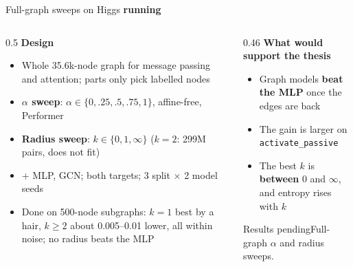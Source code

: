 \documentclass[aspectratio=169,10pt]{beamer}
\newcommand{\snote}[1]{{\scriptsize\textcolor{ink!70}{#1}}}
\newcommand{\srun}{\textcolor{warm}{\textbf{running}}}
\newcommand{\pending}[1]{\begin{alertblock}{Results pending}\small #1\end{alertblock}}
\begin{document}
\begin{frame}{Full-graph sweeps on Higgs \srun}
  \begin{columns}[T]
    \begin{column}{0.5\textwidth}
      \textbf{Design}
      \begin{itemize}\small
        \item Whole 35.6k-node graph for message passing and attention; parts only pick labelled nodes
        \item \textbf{$\alpha$ sweep}: $\alpha \in \{0, .25, .5, .75, 1\}$, affine-free, Performer
        \item \textbf{Radius sweep}: $k \in \{0, 1, \infty\}$ \snote{($k=2$: 299M pairs, does not fit)}
        \item + MLP, GCN; both targets; 3 split $\times$ 2 model seeds
        \item Done on 500-node subgraphs: $k=1$ best by a hair, $k\ge2$ about 0.005--0.01 lower, all within noise; no radius beats the MLP
      \end{itemize}
    \end{column}
    \begin{column}{0.46\textwidth}
      \textbf{What would support the thesis}
      \begin{itemize}\small
        \item Graph models \textbf{beat the MLP} once the edges are back
        \item The gain is larger on \texttt{activate\_passive}
        \item The best $k$ is \textbf{between} 0 and $\infty$, and entropy rises with $k$
      \end{itemize}
      \pending{Full-graph $\alpha$ and radius sweeps.}
    \end{column}
  \end{columns}
\end{frame}
\end{document}
